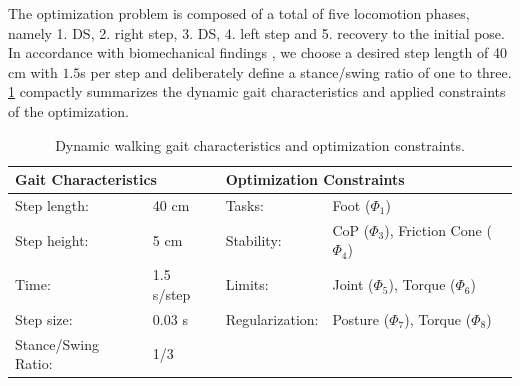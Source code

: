 The optimization problem is composed of a total of five locomotion phases, namely 1. \gls{DS}, 2. right step, 3. \gls{DS}, 4. left step and 5. recovery to the initial pose. In accordance with biomechanical findings \cite{kuo2001simple}, we choose a desired step length of 40 cm with $1.5$s per step and deliberately define a stance/swing ratio of one to three. \cref{tab:walkDynamic} compactly summarizes the dynamic gait characteristics and applied constraints of the optimization.

\begin{table}[]
\centering
\caption[Dynamic walking gait characteristics and optimization constraints]{Dynamic walking gait characteristics and optimization constraints.}
\begin{tabular}{|ll|ll|}
\hline
\multicolumn{2}{|l|}{\textbf{Gait Characteristics}} & \multicolumn{2}{l|}{\textbf{Optimization Constraints}} \\ \hline
Step length:& 40 cm 	& Tasks: 			& Foot ($\Phi_1$)\\ \hline
Step height:& 5 cm 	& Stability: 		& \gls{CoP} ($\Phi_3$), Friction Cone ($\Phi_4$)\\ \hline
Time:& 1.5 s/step	& Limits: 			& Joint ($\Phi_5$), Torque ($\Phi_6$)\\ \hline
Step size:& 0.03 s	& Regularization: 	& Posture ($\Phi_7$), Torque ($\Phi_8$)\\ \hline
Stance/Swing Ratio:& 1/3 & & \\ \hline
\end{tabular}
\label{tab:walkDynamic}
\end{table} 

